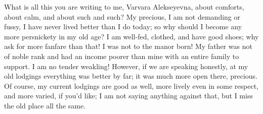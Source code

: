 What is all this you are writing to me, Varvara Alekseyevna, about comforts, about calm, and about such and such? My precious, I am not demanding or fussy, I have never lived better than I do today; so why should I become any more persnickety in my old age? I am well-fed, clothed, and have good shoes; why ask for more fanfare than that! I was not to the manor born! My father was not of noble rank and had an income poorer than mine with an entire family to support. I am no tender weakling! However, if we are speaking honestly, at my old lodgings everything was better by far; it was much more open there, precious. Of course, my current lodgings are good as well, more lively even in some respect, and more varied, if you'd like; I am not saying anything against that, but I miss the old place all the same. 